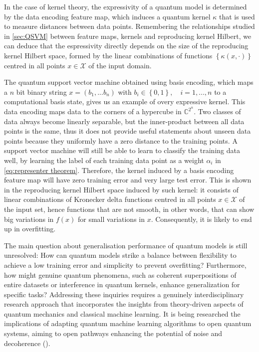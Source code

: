 In the case of kernel theory, the expressivity of a quantum model is determined by the data encoding feature map, which induces a quantum kernel $\kappa$ that is used to measure distances between data points. Remembering the relationships studied in \autoref{sec:QSVM} between feature maps, kernels and reproducing kernel Hilbert, we can deduce that the espressivity directly depends on the size of the reproducing kernel Hilbert space, formed by the linear combinations of functions $\left\lbrace \kappa(x, \cdot) \right\rbrace$ centred in all points $x \in \mathcal{X}$ of the input domain.

The quantum support vector machine obtained using basis encoding, which maps a $n$ bit binary string $x = (b_1,...b_n) $ with $b_i \in \left\lbrace 0,1\right\rbrace, \quad i=1,...,n$ to a computational basis state, gives us an example of overy expressive kernel. This data encoding maps data to the corners of a hypercube in $\mathbb{C}^{2^n}$. Two classes of data always become linearly separable, but the inner-product between all data points is the same, thus it does not provide useful statements about unseen data points because they uniformly have a zero distance to the training points. A support vector machine will still be able to learn to classify the training data well, by learning the label of each training data point as a weight $\alpha_i$ in \autoref{eq:representer theorem}. Therefore, the kernel induced by a basis encoding feature map will have zero training error and very large test error. This is shown in the reproducing kernel Hilbert space induced by such kernel: it consists of linear combinations of Kronecker delta functions centred in all points $x \in \mathcal{X}$ of the input set, hence functions that are not smooth, in other words, that can show big variations in $f(x)$ for small variations in $x$. Consequently, it is likely to end up in overfitting. 

The main question about generalisation performance of quantum models is still unresolved: How can quantum models strike a balance between flexibility to achieve a low training error and simplicity to prevent overfitting? Furthermore, how might genuine quantum phenomena, such as coherent superpositions of entire datasets or interference in quantum kernels, enhance generalization for specific tasks? Addressing these inquiries requires a genuinely interdisciplinary research approach that incorporates the insights from theory-driven aspects of quantum mechanics and classical machine learning. It is being researched the implications of adapting quantum machine learning algorithms to open quantum systems, aiming to open pathways enhancing the potential of noise and decoherence (\cite{olivera2023benefits}).


